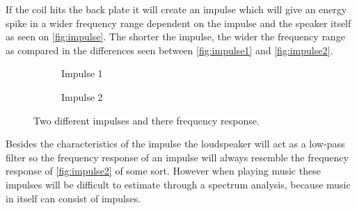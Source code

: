If the coil hits the back plate it will create an impulse which will give an energy spike in a wider frequency range dependent on the impulse and the speaker itself as seen on \autoref{fig:impulse}. The shorter the impulse, the wider the frequency range as compared in the differences seen between \autoref{fig:impulse1} and \autoref{fig:impulse2}.  

\begin{figure}[H]
\begin{subfigure}[t]{0.47\textwidth}
\centering
{}
\scalebox{0.6}{
}
\caption{Impulse 1}
\label{fig:impulse1}
\end{subfigure}
\hspace{6mm} 
\begin{subfigure}[t]{0.47\textwidth}
\centering
{}
\scalebox{0.6}{
}
\caption{Impulse 2}
\label{fig:impulse2}
\end{subfigure}
\caption{Two different impulses and there frequency response.}
\label{fig:impulse}
\end{figure}
Besides the characteristics of the impulse the loudspeaker will act as a low-pass filter so the frequency response of an impulse will always resemble the frequency response of \autoref{fig:impulse2} of some sort. However when playing music these impulses will be difficult to estimate through a spectrum analysis, because music in itself can consist of impulses.     


